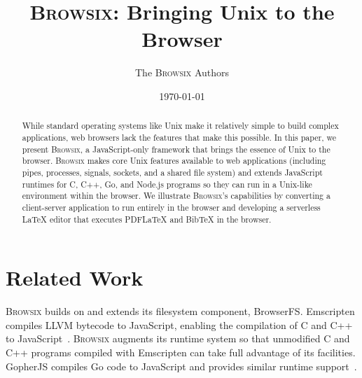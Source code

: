 \documentclass[11pt]{article}
\newcommand{\Browsix}{\textsc{Browsix}}
\begin{document}
\title{\bf \Browsix{}: Bringing Unix to the Browser}
\author{The \Browsix{} Authors}
\date{\today}
\maketitle

\begin{abstract}

While standard operating systems like Unix make it relatively simple
to build complex applications, web browsers lack the features that
make this possible. In this paper, we present \Browsix{}, a
JavaScript-only framework that brings the essence of Unix to the
browser. \Browsix{} makes core Unix features available to web
applications (including pipes, processes, signals, sockets, and a
shared file system) and extends JavaScript runtimes for C, C++, Go,
and Node.js programs so they can run in a Unix-like environment within
the browser. We illustrate \Browsix{}'s capabilities by converting a
client-server application to run entirely in the browser and
developing a serverless \LaTeX{} editor that executes PDFLaTeX and
BibTeX in the browser.

\end{abstract}

\section{Related Work}
\label{sec:related}

\Browsix{} builds on and extends its filesystem component,
BrowserFS. Emscripten compiles LLVM bytecode to JavaScript, enabling
the compilation of C and C++ to JavaScript~\cite{emscripten}.
\Browsix{} augments its runtime system so that unmodified C and C++
programs compiled with Emscripten can take full advantage of its
facilities. GopherJS compiles Go code to JavaScript and provides
similar runtime support~\cite{musiol:2016gopherjs}.

{}

\end{document}
